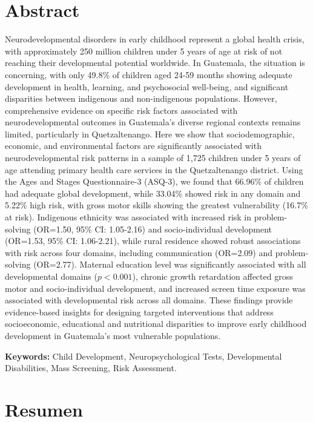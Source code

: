 \chapter*{Abstract}
Neurodevelopmental disorders in early childhood represent a global health 
crisis, with approximately 250 million children under 5 years of age at risk 
of not reaching their developmental potential worldwide. In Guatemala, the 
situation is concerning, with only 49.8\% of children aged 24-59 months 
showing adequate development in health, learning, and psychosocial well-being, 
and significant disparities between indigenous and non-indigenous populations. 
However, comprehensive evidence on specific risk factors associated with 
neurodevelopmental outcomes in Guatemala's diverse regional contexts remains 
limited, particularly in Quetzaltenango. Here we show that sociodemographic, 
economic, and environmental factors are significantly associated with 
neurodevelopmental risk patterns in a sample of 1,725 children under 5 years 
of age attending primary health care services in the Quetzaltenango district. 
Using the Ages and Stages Questionnaire-3 (ASQ-3), we found that 66.96\% of 
children had adequate global development, while 33.04\% showed risk in any 
domain and 5.22\% high risk, with gross motor skills showing the greatest 
vulnerability (16.7\% at risk). Indigenous ethnicity was associated with 
increased risk in problem-solving (OR=1.50, 95\% CI: 1.05-2.16) and 
socio-individual development (OR=1.53, 95\% CI: 1.06-2.21), while rural 
residence showed robust associations with risk across four domains, including 
communication (OR=2.09) and problem-solving (OR=2.77). Maternal education 
level was significantly associated with all developmental domains ($p<0.001$), 
chronic growth retardation affected gross motor and socio-individual 
development, and increased screen time exposure was associated with 
developmental risk across all domains. These findings provide evidence-based 
insights for designing targeted interventions that address socioeconomic, 
educational and nutritional disparities to improve early childhood 
development in Guatemala's most vulnerable populations.

\textbf{Keywords:} Child Development, Neuropsychological Tests, Developmental
Disabilities, Mass Screening, Risk Assessment.

\chapter*{Resumen}

